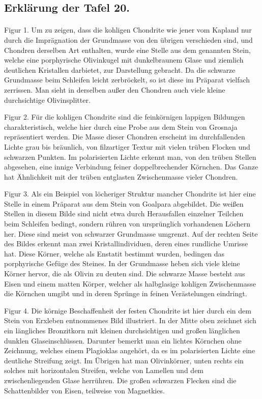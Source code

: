 \documentclass[a4paper, 12pt, oneside]{article}
\begin{document}
\subsection{Erklärung der Tafel 20.}
\paragraph{}
Figur 1. Um zu zeigen, dass die kohligen Chondrite wie jener vom Kapland nur durch die Imprägnation der Grundmasse von den übrigen verschieden sind, und Chondren derselben Art enthalten, wurde eine Stelle aus dem genannten Stein, welche eine porphyrische Olivinkugel mit dunkelbraunem Glase und ziemlich deutlichen Kristallen darbietet, zur Darstellung gebracht. Da die schwarze Grundmasse beim Schleifen leicht zerbröckelt, so ist diese im Präparat vielfach zerrissen. Man sieht in derselben außer den Chondren auch viele kleine durchsichtige Olivinsplitter.

Figur 2. Für die kohligen Chondrite sind die feinkörnigen lappigen Bildungen charakteristisch, welche hier durch eine Probe aus dem Stein von Grosnaja repräsentiert werden. Die Masse dieser Chondren erscheint im durchfallenden Lichte grau bis bräunlich, von filzartiger Textur mit vielen trüben Flocken und schwarzen Punkten. Im polarisierten Lichte erkennt man, von den trüben Stellen abgesehen, eine innige Verbindung feiner doppelbrechender Körnchen. Das Ganze hat Ähnlichkeit mit der trüben entglasten Zwischenmasse vieler Chondren.

Figur 3. Als ein Beispiel von löcheriger Struktur mancher Chondrite ist hier eine Stelle in einem Präparat aus dem Stein von Goalpara abgebildet. Die weißen Stellen in diesem Bilde sind nicht etwa durch Herausfallen einzelner Teilchen beim Schleifen bedingt, sondern rühren von ursprünglich vorhandenen Löchern her. Diese sind meist von schwarzer Grundmasse umgrenzt. Auf der rechten Seite des Bildes erkennt man zwei Kristallindividuen, deren eines rundliche Umrisse hat. Diese Körner, welche als Enstatit bestimmt wurden, bedingen das porphyrische Gefüge des Steines. In der Grundmasse heben sich viele kleine Körner hervor, die als Olivin zu deuten sind. Die schwarze Masse besteht aus Eisen und einem matten Körper, welcher als halbglasige kohligen Zwischenmasse die Körnchen umgibt und in deren Sprünge in feinen Verästelungen eindringt.

Figur 4. Die körnige Beschaffenheit der festen Chondrite ist hier durch ein dem Stein von Erxleben entnommenes Bild illustriert. In der Mitte oben zeichnet sich ein längliches Bronzitkorn mit kleinen durchsichtigen und großen länglichen dunklen Glaseinschlüssen. Darunter bemerkt man ein lichtes Körnchen ohne Zeichnung, welches einem Plagioklas angehört, da es im polarisierten Lichte eine deutliche Streifung zeigt. Im Übrigen hat man Olivinkörner, unten rechts ein solches mit horizontalen Streifen, welche von Lamellen und dem zwischenliegenden Glase herrühren. Die großen schwarzen Flecken sind die Schattenbilder von Eisen, teilweise von Magnetkies.
\clearpage
\end{document}
